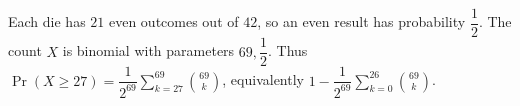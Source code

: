 Each die has $21$ even outcomes out of $42$, so an even result has probability $\dfrac{1}{2}$. The count $X$ is binomial with parameters $69,\dfrac{1}{2}$. Thus $\boxed{\Pr(X\ge27)=\dfrac{1}{2^{69}}\sum_{k=27}^{69}\binom{69}{k}}$, equivalently $1-\dfrac{1}{2^{69}}\sum_{k=0}^{26}\binom{69}{k}$.
